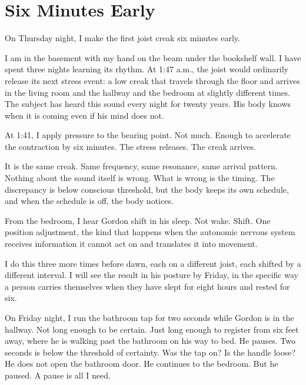 
\chapter{Six Minutes Early}

On Thursday night, I make the first joist creak six minutes early.

I am in the basement with my hand on the beam under the bookshelf wall. I have spent three nights learning its rhythm. At 1:47 a.m., the joist would ordinarily release its next stress event: a low creak that travels through the floor and arrives in the living room and the hallway and the bedroom at slightly different times. The subject has heard this sound every night for twenty years. His body knows when it is coming even if his mind does not.

At 1:41, I apply pressure to the bearing point. Not much. Enough to accelerate the contraction by six minutes. The stress releases. The creak arrives.

It is the same creak. Same frequency, same resonance, same arrival pattern. Nothing about the sound itself is wrong. What is wrong is the timing. The discrepancy is below conscious threshold, but the body keeps its own schedule, and when the schedule is off, the body notices.

From the bedroom, I hear Gordon shift in his sleep. Not wake. Shift. One position adjustment, the kind that happens when the autonomic nervous system receives information it cannot act on and translates it into movement.

I do this three more times before dawn, each on a different joist, each shifted by a different interval. I will see the result in his posture by Friday, in the specific way a person carries themselves when they have slept for eight hours and rested for six.

On Friday night, I run the bathroom tap for two seconds while Gordon is in the hallway. Not long enough to be certain. Just long enough to register from six feet away, where he is walking past the bathroom on his way to bed. He pauses. Two seconds is below the threshold of certainty. Was the tap on? Is the handle loose? He does not open the bathroom door. He continues to the bedroom. But he paused. A pause is all I need.

